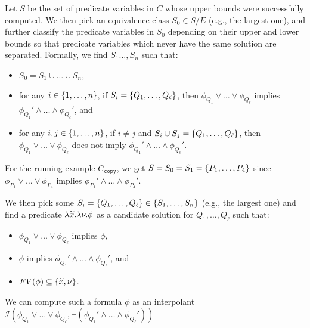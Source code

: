 Let \(S\) be the set of predicate variables in \(C\) whose upper bounds
were successfully computed.  We then pick an equivalence class \(S_0 \in
S / E\) (e.g., the largest one), and further classify the predicate
variables in \(S_0\) depending on their upper and lower bounds so that
predicate variables which never have the same solution are separated.
%
Formally, we find \(S_1\dots,S_n\) such that:
\begin{itemize}
\item \(S_0 = S_1 \cup \dots \cup S_n\),
\item for any \(i \in \{{1,\dots,n}\}\), if \(S_i =
\{{Q_1,\dots,Q_{\ell}}\}\), then \(\phi_{Q_1} \lor \dots \lor
\phi_{Q_{\ell}}\) implies \(\phi_{Q_1}' \land \dots \land
\phi_{Q_{\ell}}'\), and
\item for any \(i,j \in \{{1,\dots,n}\}\), if \(i \neq j\) and
\(S_i \cup S_j = \{{Q_1,\dots,Q_{\ell}}\}\), then \(\phi_{Q_1} \lor
\dots \lor \phi_{Q_{\ell}}\) does not imply \(\phi_{Q_1}' \land \dots
\land \phi_{Q_{\ell}}'\).
\end{itemize}
For the running example \(C_{\texttt{copy}}\), we get
\(S=S_0=S_1=\{{P_1,\dots,P_4}\}\) since \(\phi_{P_1} \lor \dots \lor
\phi_{P_4}\) implies \(\phi_{P_1}' \land \dots \land \phi_{P_4}'\).

We then pick some \(S_i = \{{Q_1,\dots,Q_{\ell}}\} \in
\{{S_1,\dots,S_n}\}\) (e.g., the largest one) and find a predicate
\(\lambda\widetilde{x}.\lambda \nu.\phi\) as a candidate solution for
\(Q_1,\dots,Q_{\ell}\) such that:
\begin{itemize}
\item \(\phi_{Q_1} \lor \dots \lor \phi_{Q_{\ell}}\) implies \(\phi\),
\item \(\phi\) implies \(\phi_{Q_1}' \land \dots \land \phi_{Q_{\ell}}'\), and
\item \(\mathit{FV}({\phi}) \subseteq \{{\widetilde{x},\nu}\}\).
\end{itemize}
We can compute such a formula \(\phi\) as an interpolant
\(\mathcal{I}(\phi_{Q_1} \lor \dots \lor \phi_{Q_{\ell}},\neg
(\phi_{Q_1}' \land \dots \land \phi_{Q_{\ell}}'))\) 



